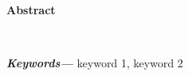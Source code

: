 \vspace*{4cm}
\begin{center}
    {\Large\bf Abstract}
\end{center} \vskip 0.5cm \vskip 0.5cm
\lipsum[1] \\

\providecommand{\keywords}[1] {
  \small	
  \textbf{\textit{Keywords---}} #1
}
\keywords{keyword 1, keyword 2}

